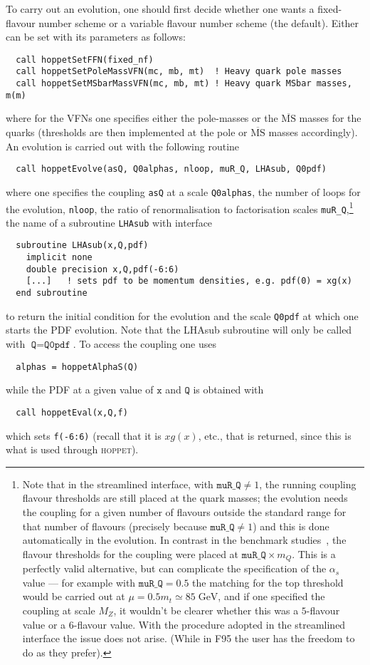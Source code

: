 \documentclass[12pt]{article}
\newcommand{\GeV}{\;\mathrm{GeV}}
\newcommand{\as}{\alpha_s}
\newcommand{\MSbar}{\overline{\mathrm{MS}}}
\newcommand{\hoppet}{\textsc{hoppet}\xspace}
\newcommand{\ttt}[1]{\texttt{#1}}
\begin{document}
To carry out an evolution, one should first decide whether one wants a
fixed-flavour number scheme or a variable flavour number scheme (the
default). Either can be set with its parameters as follows:
\begin{lstlisting}
  call hoppetSetFFN(fixed_nf)
  call hoppetSetPoleMassVFN(mc, mb, mt)  ! Heavy quark pole masses
  call hoppetSetMSbarMassVFN(mc, mb, mt) ! Heavy quark MSbar masses, m(m)
\end{lstlisting}
where for the VFNs one specifies either the pole-masses or the
$\MSbar$ masses for the quarks (thresholds are then implemented at the
pole or $\MSbar$ masses accordingly). An evolution is carried out with
the following routine
\begin{lstlisting}
  call hoppetEvolve(asQ, Q0alphas, nloop, muR_Q, LHAsub, Q0pdf)
\end{lstlisting}
where one specifies the coupling \ttt{asQ} at a scale \ttt{Q0alphas},
the number of loops for the evolution, \ttt{nloop}, the ratio of
renormalisation to factorisation scales \ttt{muR\_Q},\footnote{Note
  that in the streamlined interface, with $\ttt{muR\_Q}\ne 1$, the running
  coupling flavour thresholds are still placed at the quark masses;
  the evolution needs the coupling for a given number of flavours
  outside the standard range for that number of flavours (precisely
  because $\ttt{muR\_Q}\ne 1$) and this is done automatically in the
  evolution. In contrast in the benchmark studies~\cite{Giele:2002hx,Dittmar:2005ed},
  the flavour thresholds for the coupling were placed at $\ttt{muR\_Q}
  \times m_Q$.  This is a perfectly valid alternative, but can
  complicate the specification of the $\as$ value --- for example with
  $\ttt{muR\_Q} = 0.5$ the matching for the top threshold would be
  carried out at $\mu = 0.5 m_t \simeq 85 \GeV$, and if one specified
  the coupling at scale $M_Z$, it wouldn't be clearer whether this was
  a $5$-flavour value or a $6$-flavour value. With the procedure
  adopted in the streamlined interface the issue does not arise. (While in
  F95 the user has the freedom to do as they prefer). } %
the name of a subroutine \ttt{LHAsub} with interface
\begin{lstlisting}
  subroutine LHAsub(x,Q,pdf)
    implicit none
    double precision x,Q,pdf(-6:6)
    [...]   ! sets pdf to be momentum densities, e.g. pdf(0) = xg(x)
  end subroutine 
\end{lstlisting}
to return the initial condition for the evolution and the scale
\ttt{Q0pdf} at which one starts the PDF evolution. Note that the
LHAsub subroutine will only be called with $\ttt{Q}=\ttt{Q0pdf}$.
To access the coupling one uses
\begin{lstlisting}
  alphas = hoppetAlphaS(Q)
\end{lstlisting}
while the PDF at a given value of $\ttt{x}$ and $\ttt{Q}$ is obtained with 
\begin{lstlisting}
  call hoppetEval(x,Q,f)
\end{lstlisting}
which sets \ttt{f(-6:6)} (recall that it is $xg(x)$, etc., that is
returned, since this is what is
used through \hoppet).
\end{document}
